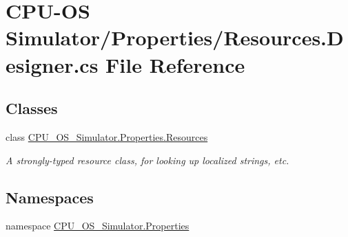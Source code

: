 \hypertarget{_c_p_u-_o_s_01_simulator_2_properties_2_resources_8_designer_8cs}{}\section{C\+P\+U-\/\+O\+S Simulator/\+Properties/\+Resources.Designer.\+cs File Reference}
\label{_c_p_u-_o_s_01_simulator_2_properties_2_resources_8_designer_8cs}
\subsection*{Classes}
\begin{DoxyCompactItemize}
\item 
class \hyperlink{class_c_p_u___o_s___simulator_1_1_properties_1_1_resources}{C\+P\+U\+\_\+\+O\+S\+\_\+\+Simulator.\+Properties.\+Resources}
\begin{DoxyCompactList}\small\item\em A strongly-\/typed resource class, for looking up localized strings, etc. \end{DoxyCompactList}\end{DoxyCompactItemize}
\subsection*{Namespaces}
\begin{DoxyCompactItemize}
\item 
namespace \hyperlink{namespace_c_p_u___o_s___simulator_1_1_properties}{C\+P\+U\+\_\+\+O\+S\+\_\+\+Simulator.\+Properties}
\end{DoxyCompactItemize}
